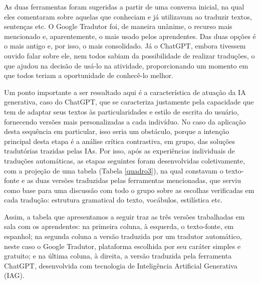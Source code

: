 \documentclass[portuguese]{textolivre}
\begin{document}
As duas ferramentas foram sugeridas a partir de uma conversa inicial, na qual eles comentaram sobre aquelas que conheciam e já utilizavam ao traduzir textos, sentenças etc. O Google Tradutor foi, de maneira unânime, o recurso mais mencionado e, aparentemente, o mais usado pelos aprendentes. Das duas opções é o mais antigo e, por isso, o mais consolidado. Já o ChatGPT, embora tivessem ouvido falar sobre ele, nem todos sabiam da possibilidade de realizar traduções, o que ajudou na decisão de usá-lo na atividade, proporcionando um momento em que todos teriam a oportunidade de conhecê-lo melhor.

Um ponto importante a ser ressaltado aqui é a característica de atuação da IA generativa, caso do ChatGPT, que se caracteriza justamente pela capacidade que tem de adaptar seus textos às particularidades e estilo de escrita do usuário, fornecendo versões mais personalizadas a cada indivíduo. No caso da aplicação desta sequência em particular, isso seria um obstáculo, porque a intenção principal desta etapa é a análise crítica contrastiva, em grupo, das soluções tradutórias trazidas pelas IAs. Por isso, após as experiências individuais de traduções automáticas, as etapas seguintes foram desenvolvidas coletivamente, com a projeção de uma tabela (Tabela \ref{quadro3}), na qual constavam o texto-fonte e as duas versões traduzidas pelas ferramentas mencionadas, que serviu como base para uma discussão com todo o grupo sobre as escolhas verificadas em cada tradução: estrutura gramatical do texto, vocábulos, estilística etc.

Assim, a tabela que apresentamos a seguir traz as três versões trabalhadas em sala com os aprendentes: na primeira coluna, à esquerda, o texto-fonte, em espanhol; na segunda coluna a versão traduzida por um tradutor automático, neste caso o Google Tradutor, plataforma escolhida por seu caráter simples e gratuito; e na última coluna, à direita, a versão traduzida pela ferramenta ChatGPT, desenvolvida com tecnologia de Inteligência Artificial Generativa (IAG).
\end{document}
